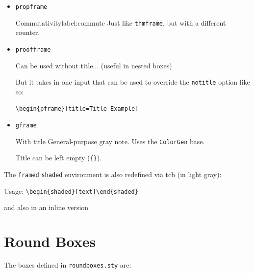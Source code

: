 \documentclass[a4paper,12pt]{report}
\begin{document}
\begin{itemize}
    \item \texttt{propframe}

        \begin{propframe}{Commutativity}{label:commute}
            Just like \texttt{thmframe}, but with a different counter.
        \end{propframe}

    \item \texttt{proofframe}
               
        \begin{pframe}
            Can be used without title... (useful in nested boxes)
        \end{pframe}

        \begin{pframe}[title=Title Example]
            But it takes in one input that can be used to override the \texttt{notitle} option like so:

            \texttt{\textbackslash begin\{pframe\}[title=Title Example]}
        \end{pframe}

    \item \texttt{gframe}
        \begin{gframe}{With title}
            General-purpose gray note. Uses the \texttt{ColorGen} base.
        \end{gframe}

        \begin{gframe}{}
            Title can be left empty (\texttt{\{\}}).
        \end{gframe}

\end{itemize}

The \texttt{framed} \texttt{shaded} environment is also redefined via tcb (in light gray):
\begin{shaded}
    Usage: \texttt{\textbackslash begin\{shaded\}[text]\textbackslash end\{shaded\}}
\end{shaded}

and also in an inline version 


\section{Round Boxes}
The boxes defined in \texttt{roundboxes.sty} are:
\end{document}
